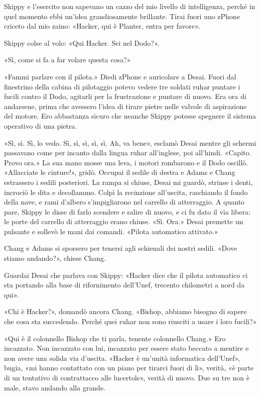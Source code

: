 Skippy e l'esercito non sapevano un cazzo del mio livello di
intelligenza, perché in quel momento ebbi un'idea grandiosamente
brillante. Tirai fuori uno zPhone criceto dal mio zaino: «Hacker, qui è
Planter, entra per favore».

Skippy colse al volo: «Qui Hacker. Sei nel Dodo?».

«Sì, come si fa a far volare questa cosa?»

«Fammi parlare con il pilota.» Diedi zPhone e auricolare a Desai. Fuori
dal finestrino della cabina di pilotaggio potevo vedere tre soldati
ruhar puntare i fucili contro il Dodo, agitarli per la frustrazione e
puntare di nuovo. Era ora di andarsene, prima che avessero l'idea di
tirare pietre nelle valvole di aspirazione del motore. Ero abbastanza
sicuro che neanche Skippy potesse spegnere il sistema operativo di una
pietra.

«Sì, sì. Sì, lo vedo. Sì, sì, sì, sì, sì. Ah, va bene», esclamò Desai
mentre gli schermi passavano come per incanto dalla lingua ruhar
all'inglese, poi all'hindi. «Capito. Provo ora.» La sua mano mosse una
leva, i motori rombarono e il Dodo oscillò. «Allacciate le cinture!»,
gridò. Occupai il sedile di destra e Adams e Chang estrassero i sedili
posteriori. La rampa si chiuse, Desai mi guardò, strinse i denti,
incrociò le dita e decollammo. Colpì la recinzione all'uscita,
raschiando il fondo della nave, e rami d'albero s'impigliarono nel
carrello di atterraggio. A quanto pare, Skippy le disse di farlo
scendere e salire di nuovo, e ci fu dato il via libera: le porte del
carrello di atterraggio erano chiuse. «Sì. Ora.» Desai premette un
pulsante e sollevò le mani dai comandi. «Pilota automatico attivato.»

Chang e Adams si sporsero per tenersi agli schienali dei nostri sedili.
«Dove stiamo andando?», chiese Chang.

Guardai Desai che parlava con Skippy: «Hacker dice che il pilota
automatico ci sta portando alla base di rifornimento dell'Unef, trecento
chilometri a nord da qui».

«Chi è Hacker?», domandò ancora Chang. «Bishop, abbiamo bisogno di
sapere che cosa sta succedendo. Perché quei ruhar non sono riusciti a
usare i loro fucili?»

«Qui è il colonnello Bishop che ti parla, tenente colonnello Chang.» Ero
incazzato. Non incazzato con lui, incazzato per essere stato beccato a
mentire e non avere una solida via d'uscita. «Hacker è un'unità
informatica dell'Unef», bugia, «mi hanno contattato con un piano per
tirarci fuori di lì», verità, «è parte di un tentativo di contrattacco
alle lucertole», verità di nuovo. Due su tre non è male, stavo andando
alla grande.

